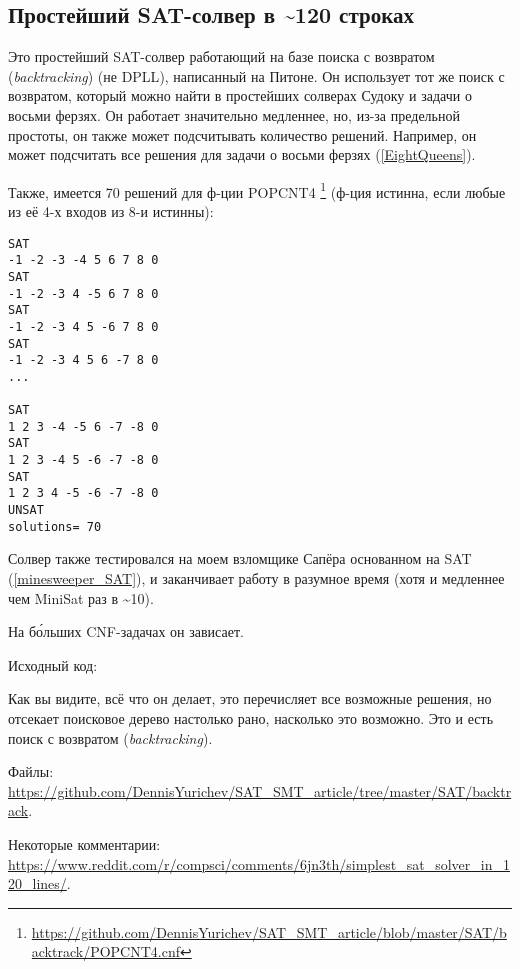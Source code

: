 \subsection{Простейший SAT-солвер в \textasciitilde{}120 строках}
\label{SAT_backtrack}

Это простейший SAT-солвер работающий на базе поиска с возвратом (\textit{backtracking}) (не \ac{DPLL}), написанный
на Питоне.
Он использует тот же поиск с возвратом, который можно найти в простейших солверах Судоку и задачи о восьми ферзях.
Он работает значительно медленнее, но, из-за предельной простоты, он также может подсчитывать количество решений.
Например, он может подсчитать все решения для задачи о восьми ферзях (\ref{EightQueens}).

Также, имеется 70 решений для ф-ции POPCNT4
\footnote{\url{https://github.com/DennisYurichev/SAT_SMT_article/blob/master/SAT/backtrack/POPCNT4.cnf}}
(ф-ция истинна, если любые из её 4-х входов из 8-и истинны):

\begin{lstlisting}
SAT
-1 -2 -3 -4 5 6 7 8 0
SAT
-1 -2 -3 4 -5 6 7 8 0
SAT
-1 -2 -3 4 5 -6 7 8 0
SAT
-1 -2 -3 4 5 6 -7 8 0
...

SAT
1 2 3 -4 -5 6 -7 -8 0
SAT
1 2 3 -4 5 -6 -7 -8 0
SAT
1 2 3 4 -5 -6 -7 -8 0
UNSAT
solutions= 70
\end{lstlisting}

Солвер также тестировался на моем взломщике Сапёра основанном на SAT (\ref{minesweeper_SAT}),
и заканчивает работу в разумное время (хотя и медленнее чем MiniSat раз в \textasciitilde{}10).

На б\'{о}льших \ac{CNF}-задачах он зависает.

Исходный код:


Как вы видите, всё что он делает, это перечисляет все возможные решения, но отсекает поисковое дерево настолько рано,
насколько это возможно.
Это и есть поиск с возвратом (\textit{backtracking}).

Файлы: \url{https://github.com/DennisYurichev/SAT_SMT_article/tree/master/SAT/backtrack}.

Некоторые комментарии: \url{https://www.reddit.com/r/compsci/comments/6jn3th/simplest_sat_solver_in_120_lines/}.


